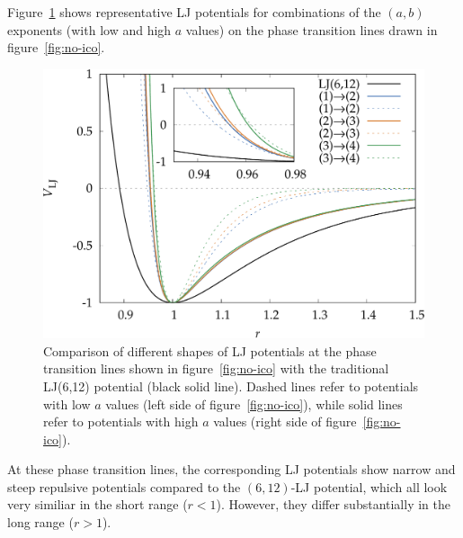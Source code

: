 Figure~\ref{fig:compareLJ} shows representative LJ potentials for combinations
of the $(a,b)$ exponents (with low and high $a$ values) on the phase transition
lines drawn in figure~\ref{fig:no-ico}. 
%
\begin{figure}[htb]\centering
    \includegraphics[width=.8\columnwidth]{gregory-newton/compareLJ.pdf}
    \caption{Comparison of different shapes of LJ potentials at the phase
    transition lines shown in figure~\ref{fig:no-ico} with the traditional
    LJ(6,12) potential (black solid line). Dashed lines refer to potentials
    with low $a$ values (left side of figure~\ref{fig:no-ico}), while solid lines
    refer to potentials with high $a$ values (right side of
    figure~\ref{fig:no-ico}).}
    \label{fig:compareLJ}
\end{figure}
%
At these phase transition lines, the corresponding \ac{LJ} potentials show
narrow and steep repulsive potentials compared to the $(6,12)$-\ac{LJ}
potential, which all look very similiar in the short range ($r<1$). However,
they differ substantially in the long range ($r>1$).

